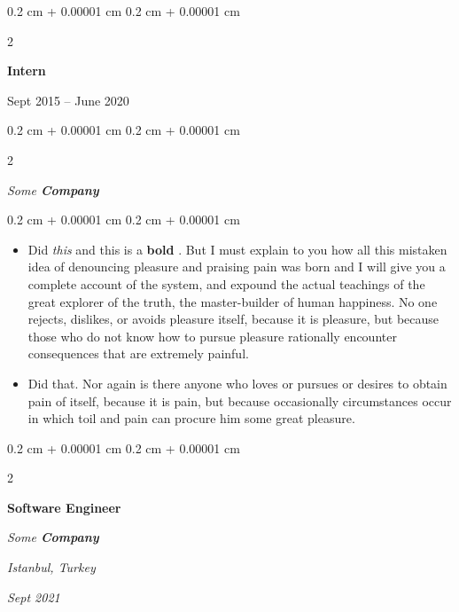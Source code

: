 \documentclass[10pt, letterpaper]{article}
\newenvironment{highlights}{
    \begin{itemize}[
        topsep=0.10 cm,
        parsep=0.10 cm,
        partopsep=0pt,
        itemsep=0pt,
        leftmargin=0.4 cm + 10pt
    ]
}{
    \end{itemize}
} %
\newenvironment{onecolentry}{
    \begin{adjustwidth}{
        0.2 cm + 0.00001 cm
    }{
        0.2 cm + 0.00001 cm
    }
}{
    \end{adjustwidth}
} %
\newenvironment{twocolentry}[2][]{
    \onecolentry
    \def\secondColumn{#2}
    \setcolumnwidth{\fill, 4.5 cm}
    \begin{paracol}{2}
}{
    \switchcolumn \raggedleft \secondColumn
    \end{paracol}
    \endonecolentry
} %
\let\hrefWithoutArrow\href
\renewcommand{\href}[2]{\hrefWithoutArrow{#1}{\ifthenelse{\equal{#2}{}}{ }{#2 }\raisebox{.15ex}{\footnotesize \faExternalLink*}}}
\begin{document}
        \vspace{0.2 cm}

                \begin{twocolentry}{
                    Sept 2015 – June 2020
                }
                \textbf{Intern}
                \end{twocolentry}
            \begin{twocolentry}{
            }
            \textit{Some \textbf{Company}}
            \end{twocolentry}

        \vspace{0.10 cm}
        \begin{onecolentry}
            \begin{highlights}
                \item Did \textit{this} and this is a \textbf{bold} \href{https://example.com}{link}. But I must explain to you how all this mistaken idea of denouncing pleasure and praising pain was born and I will give you a complete account of the system, and expound the actual teachings of the great explorer of the truth, the master-builder of human happiness. No one rejects, dislikes, or avoids pleasure itself, because it is pleasure, but because those who do not know how to pursue pleasure rationally encounter consequences that are extremely painful.
                \item Did that. Nor again is there anyone who loves or pursues or desires to obtain pain of itself, because it is pain, but because occasionally circumstances occur in which toil and pain can procure him some great pleasure.
            \end{highlights}
        \end{onecolentry}


        \vspace{0.2 cm}

            \begin{twocolentry}{
        \textit{Istanbul, Turkey}

        \textit{Sept 2021}    }
                \textbf{Software Engineer}

                \textit{Some \textbf{Company}}
            \end{twocolentry}
\end{document}

